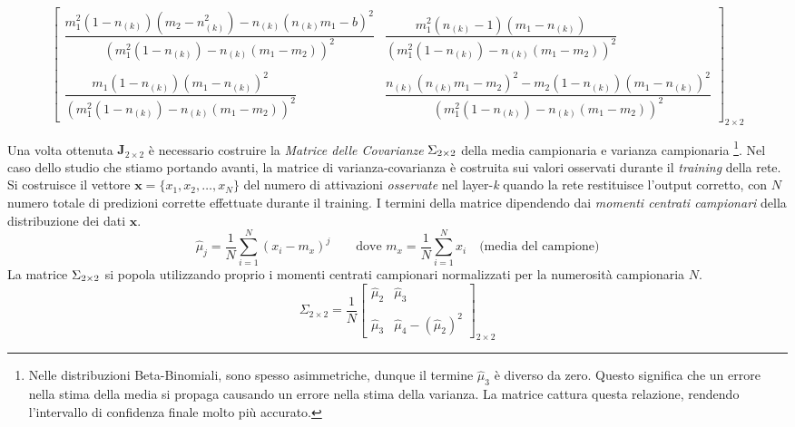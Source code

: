 \documentclass[10pt]{article} %
\begin{document}
\begin{equation}
    \begin{bmatrix}
        \dfrac{m_{1}^{2}(1-n_{(k)})(m_{2}-n_{(k)}^{2}) - n_{(k)}(n_{(k)}m_{1}-b)^{2}}{(m_{1}^{2}(1-n_{(k)}) - n_{(k)}(m_{1}-m_{2}))^{2}} & 
        \dfrac{m_{1}^{2}(n_{(k)}-1)(m_{1}-n_{(k)})}{(m_{1}^{2}(1-n_{(k)}) - n_{(k)}(m_{1}-m_{2}))^{2}} \\ \\
        \dfrac{m_{1}(1-n_{(k)})(m_{1}-n_{(k)})^{2}}{(m_{1}^{2}(1-n_{(k)}) - n_{(k)}(m_{1}-m_{2}))^{2}} & 
        \dfrac{n_{(k)}(n_{(k)}m_{1}-m_{2})^{2} - m_{2}(1-n_{(k)})(m_{1}-n_{(k)})^{2}}{(m_{1}^{2}(1-n_{(k)}) - n_{(k)}(m_{1}-m_{2}))^{2}}
    \end{bmatrix}_{2\times2}
\end{equation}

Una volta ottenuta $\mathbf{J}_{2\times2}$ è necessario costruire la \textit{Matrice delle Covarianze} $\large\Sigma_{2\times2}$ della media campionaria e varianza campionaria \footnote{Nelle distribuzioni Beta-Binomiali, sono spesso asimmetriche, dunque il termine $\hat{\mu}_{3}$ è diverso da zero. Questo significa che un errore nella stima della media si propaga causando un errore nella stima della varianza. La matrice cattura questa relazione, rendendo l'intervallo di confidenza finale molto più accurato.}. Nel caso dello studio che stiamo portando avanti, la matrice di varianza-covarianza è costruita sui valori osservati durante il \textit{training} della rete. Si costruisce il vettore $\mathbf{x} = \{x_{1}, x_{2}, \dots, x_{N}\}$ del numero di attivazioni \textit{osservate} nel layer-\textit{k} quando la rete restituisce l'output corretto, con $N$ numero totale di predizioni corrette effettuate durante il training. I termini della matrice dipendendo dai \textit{momenti centrati campionari} della distribuzione dei dati $\mathbf{x}$.
\begin{equation}
    \hat{\mu}_{j} = \dfrac{1}{N}\sum_{i=1}^{N}(x_{i}-m_{x})^{j}\qquad\mbox{dove } m_{x} = \dfrac{1}{N}\sum_{i=1}^{N}x_{i} \quad\mbox{(media del campione)}
\end{equation}
La matrice $\large\Sigma_{2\times2}$ si popola utilizzando proprio i momenti centrati campionari normalizzati per la numerosità campionaria $N$.
\begin{equation}
    \Sigma_{2\times2} = \dfrac{1}{N} 
    \begin{bmatrix}
        \hat{\mu}_{2} & \hat{\mu}_{3} \\ \\
        \hat{\mu}_{3} & \hat{\mu}_{4} - (\hat{\mu}_{2})^{2}
    \end{bmatrix}_{2\times2}
\end{equation}
\end{document}
